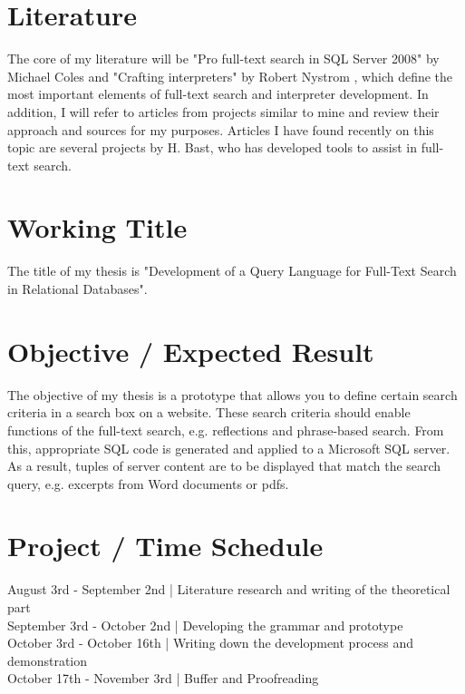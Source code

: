 \section{Literature}
The core of my literature will be "Pro full-text search in SQL Server 2008" by Michael Coles \parencite{coles_pro_2009} and "Crafting interpreters" by Robert Nystrom \parencite{nystrom_crafting_2021}, which define the most important elements of full-text search and interpreter development. In addition, I will refer to articles from projects similar to mine and review their approach and sources for my purposes. Articles I have found recently on this topic are several projects by H. Bast, who has developed tools to assist in full-text search. \parencite{bast_index_2013}\parencite{bast_broccoli_2013}
\section{Working Title}
The title of my thesis is "Development of a Query Language for Full-Text Search in Relational Databases".
\newpage
\section{Objective / Expected Result}
The objective of my thesis is a prototype that allows you to define certain search criteria in a search box on a website. These search criteria should enable functions of the full-text search, e.g. reflections and phrase-based search. From this, appropriate SQL code is generated and applied to a Microsoft SQL server. As a result, tuples of server content are to be displayed that match the search query, e.g. excerpts from Word documents or pdfs.
\section{Project / Time Schedule}
August 3rd - September 2nd | Literature research and writing of the theoretical part\\
September 3rd - October 2nd | Developing the grammar and prototype\\
October 3rd - October 16th | Writing down the development process and demonstration\\
October 17th - November 3rd | Buffer and Proofreading
